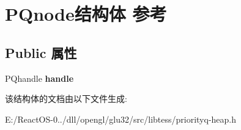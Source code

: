 \hypertarget{struct_p_qnode}{}\section{P\+Qnode结构体 参考}
\label{struct_p_qnode}
\subsection*{Public 属性}
\begin{DoxyCompactItemize}
\item 
\mbox{\label{struct_p_qnode_a19ca2438436e9d6566223071375ea2fc}} 
P\+Qhandle {\bfseries handle}
\end{DoxyCompactItemize}


该结构体的文档由以下文件生成\+:\begin{DoxyCompactItemize}
\item 
E\+:/\+React\+O\+S-\/0../dll/opengl/glu32/src/libtess/priorityq-\/heap.\+h\end{DoxyCompactItemize}
